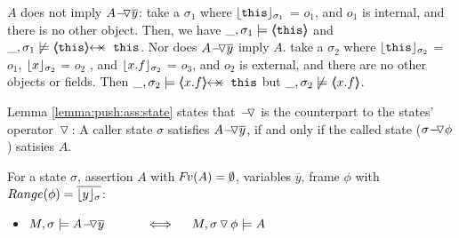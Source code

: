  


\newcommand{\sigmas}{\widetilde \sigma}



\vspace{.1cm}

\begin{example}
\label{push:does:not:imply}
$A$ does not imply $\PushAS {y} {A}$: \Eg  take 
  a   $\sigma_1$ where $\interpret {\sigma_1} {\prg{this}}$ = $o_1$, and $o_1$ is internal,  and there is no other object. Then, we have
$\_,\sigma_1 \models \inside {\prg{this}}$ and $\_,\sigma_1 \not\models \protectedFrom {\prg{this}} {\prg{this}}$.
Nor does  $\PushAS {y} {A}$  imply $A$. \Eg  take a $\sigma_2$ where $\interpret {\sigma_2} {\prg{this}}$ = $o_1$,
 $\interpret {\sigma_2} {x}$ = $o_2$ , and  $\interpret {\sigma_2} {x.f}$ = $o_3$, and $o_2$ is external, and there are no other objects or fields.
 Then $\_,\sigma_2 \models   \protectedFrom {x.f} {\prg{this}}$ but  $\_,\sigma_2 \not\models \inside {x.f}$.
\end{example}

 Lemma \ref{lemma:push:ass:state}  states that $\FIXSymbolA$ is the counterpart to the states' operator $\pushSymbol$:
A caller state
$\sigma$ satisfies  $\PushAS y A$, if and only if the called state  ($\PushASLong {\phi} {\sigma}$) %
satisies $A$.  


\begin{lemma} 
\label{lemma:push:ass:state}
For a  state  $\sigma$, assertion $A$ with $\fv(A)=\emptyset$,  variables   $\overline y$, frame $\phi$ with $Range (\phi)=\overline {\interpret \sigma y}$:


\begin{itemize} %
 \item
 \label{lemma:push:ass:state:one}
 \label{lemma:push:ass:state:two}
$M, \sigma \models \PushAS  {y} {A}\ \  \ \ \ \ \  \ \ \    \Longleftrightarrow  \ \ \ \ M,  \PushSLong {\phi} {\sigma}   \models A$
\end{itemize}  %
\end{lemma}


